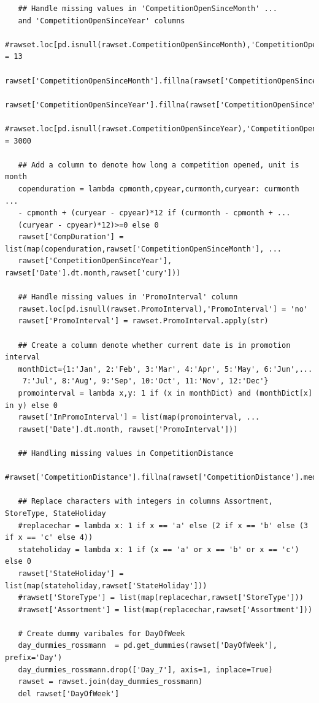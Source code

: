 \documentclass[11pt]{article}
\begin{document}
\begin{verbatim}
   ## Handle missing values in 'CompetitionOpenSinceMonth' ...
   and 'CompetitionOpenSinceYear' columns
   #rawset.loc[pd.isnull(rawset.CompetitionOpenSinceMonth),'CompetitionOpenSinceMonth'] = 13
   rawset['CompetitionOpenSinceMonth'].fillna(rawset['CompetitionOpenSinceMonth'].median())
   rawset['CompetitionOpenSinceYear'].fillna(rawset['CompetitionOpenSinceYear'].median())
   #rawset.loc[pd.isnull(rawset.CompetitionOpenSinceYear),'CompetitionOpenSinceYear'] = 3000
   
   ## Add a column to denote how long a competition opened, unit is month
   copenduration = lambda cpmonth,cpyear,curmonth,curyear: curmonth ...
   - cpmonth + (curyear - cpyear)*12 if (curmonth - cpmonth + ...
   (curyear - cpyear)*12)>=0 else 0 
   rawset['CompDuration'] = list(map(copenduration,rawset['CompetitionOpenSinceMonth'], ...
   rawset['CompetitionOpenSinceYear'], rawset['Date'].dt.month,rawset['cury']))
   
   ## Handle missing values in 'PromoInterval' column
   rawset.loc[pd.isnull(rawset.PromoInterval),'PromoInterval'] = 'no'
   rawset['PromoInterval'] = rawset.PromoInterval.apply(str)
   
   ## Create a column denote whether current date is in promotion interval
   monthDict={1:'Jan', 2:'Feb', 3:'Mar', 4:'Apr', 5:'May', 6:'Jun',...
    7:'Jul', 8:'Aug', 9:'Sep', 10:'Oct', 11:'Nov', 12:'Dec'}
   promointerval = lambda x,y: 1 if (x in monthDict) and (monthDict[x] in y) else 0
   rawset['InPromoInterval'] = list(map(promointerval, ...
   rawset['Date'].dt.month, rawset['PromoInterval']))
   
   ## Handling missing values in CompetitionDistance
   #rawset['CompetitionDistance'].fillna(rawset['CompetitionDistance'].median())
   
   ## Replace characters with integers in columns Assortment, StoreType, StateHoliday
   #replacechar = lambda x: 1 if x == 'a' else (2 if x == 'b' else (3 if x == 'c' else 4))
   stateholiday = lambda x: 1 if (x == 'a' or x == 'b' or x == 'c') else 0
   rawset['StateHoliday'] = list(map(stateholiday,rawset['StateHoliday']))
   #rawset['StoreType'] = list(map(replacechar,rawset['StoreType']))
   #rawset['Assortment'] = list(map(replacechar,rawset['Assortment']))
   
   # Create dummy varibales for DayOfWeek
   day_dummies_rossmann  = pd.get_dummies(rawset['DayOfWeek'], prefix='Day')
   day_dummies_rossmann.drop(['Day_7'], axis=1, inplace=True)
   rawset = rawset.join(day_dummies_rossmann)
   del rawset['DayOfWeek']
   

\end{verbatim}
\end{document}
